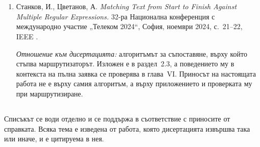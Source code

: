 \clearpage
{}
\section*{}

\subsection*{}

\begin{enumerate}[leftmargin=*]
  \item Станков, И., Цветанов, А. \emph{Matching Text from Start to Finish Against Multiple
        Regular Expressions.} 32-ра Национална конференция с международно участие
        „Телеком 2024“, София, ноември 2024, с.~21--22, IEEE \cite{stankov2024regex}.

        \emph{Отношение към дисертацията:} алгоритъмът за съпоставяне, върху който стъпва
        маршрутизаторът. Изложен е в раздел~2.3, а поведението му в контекста на пълна
        заявка се проверява в глава~VI. Приносът на настоящата работа не е върху самия
        алгоритъм, а върху приложението и проверката му при маршрутизиране.
\end{enumerate}

\subsection*{}

Списъкът се води отделно и се поддържа в съответствие с приносите от справката. Всяка тема е
изведена от работа, която дисертацията извършва така или иначе, и е цитируема в нея.

